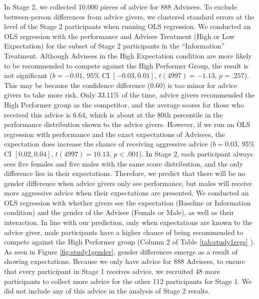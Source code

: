 \documentclass[
  man,floatsintext]{apa6}
\begin{document}
In Stage 2, we collected 10,000 pieces of advice for 888 Advisees. To exclude between-person differences from advice givers, we clustered standard errors at the level of the Stage 2 participants when running OLS regression. We conducted an OLS regression with the performance and Advisee Treatment (High or Low Expectation) for the subset of Stage 2 participants in the ``Information'' Treatment. Although Advisees in the High Expectation condition are more likely to be recommended to compete against the High Performer Group, the result is not significant (\(b = -0.01\), 95\% CI \([-0.03, 0.01]\), \(t(4997) = -1.13\), \(p = .257\)). This may be because the confidence difference (0.60) is too minor for advice givers to take more risk. Only 33.11\% of the time, advice givers recommended the High Performer group as the competitor, and the average scores for those who received this advice is 6.64, which is about at the 80th percentile in the performance distribution shown to the advice givers.
However, if we run an OLS regression with performance and the exact expectations of Advisees, the expectation does increase the chance of receiving aggressive advice (\(b = 0.03\), 95\% CI \([0.02, 0.04]\), \(t(4997) = 10.13\), \(p < .001\)).
In Stage 2, each participant always sees five females and five males with the same score distribution, and the only difference lies in their expectations. Therefore, we predict that there will be no gender difference when advice givers only see performance, but males will receive more aggressive advice when their expectations are presented. We conducted an OLS regression with whether givers see the expectation (Baseline or Information condition) and the gender of the Advisee (Female or Male), as well as their interaction. In line with our prediction, only when expectations are known to the advice giver, male participants have a higher chance of being recommended to compete against the High Performer group (Column 2 of Table \ref{tab:study1regs} ). As seen in Figure \ref{fig:study1gender}, gender differences emerge as a result of showing expectations.
Because we only have advice for 888 Advisees, to ensure that every participant in Stage 1 receives advice, we recruited 48 more participants to collect more advice for the other 112 participants for Stage 1. We did not include any of this advice in the analysis of Stage 2 results.
\end{document}
